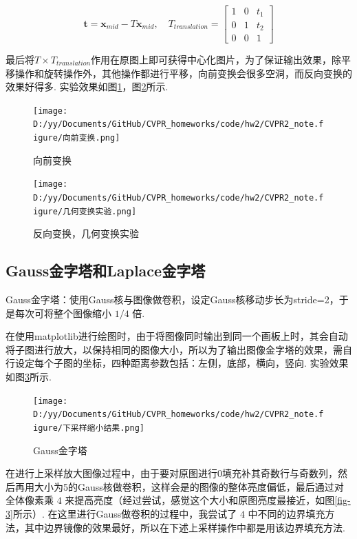 \documentclass[12pt, a4paper, oneside]{ctexart}
\numberwithin{equation}{section}  %
\begin{document}
\[\boldsymbol{t} = \boldsymbol{x}_{mid} - T\boldsymbol{x}_{mid},\quad T_{translation}=\left[\begin{matrix}1&0&t_1\\ 0&1&t_2\\0&0&1\end{matrix}\right]\]

最后将$T\times T_{translation}$作用在原图上即可获得中心化图片，为了保证输出效果，除平移操作和旋转操作外，其他操作都进行平移，向前变换会很多空洞，而反向变换的效果好得多. 实验效果如图\ref{fig-0}，图\ref{fig-1}所示.

\begin{figure}[htbp]
    \centering
    \hspace*{-1.5cm}
    \texttt{[image: D:/yy/Documents/GitHub/CVPR\_homeworks/code/hw2/CVPR2\_note.figure/向前变换.png]}
    \caption{向前变换\label{fig-0}}
\end{figure}
\begin{figure}[htbp]
    \centering
    \hspace*{-1.5cm}
    \texttt{[image: D:/yy/Documents/GitHub/CVPR\_homeworks/code/hw2/CVPR2\_note.figure/几何变换实验.png]}
    \caption{反向变换，几何变换实验\label{fig-1}}
\end{figure}

\subsection{Gauss金字塔和Laplace金字塔}

Gauss金字塔：使用Gauss核与图像做卷积，设定Gauss核移动步长为stride=2，于是每次可将整个图像缩小
\(1/4\) 倍.

在使用matplotlib进行绘图时，由于将图像同时输出到同一个画板上时，其会自动将子图进行放大，以保持相同的图像大小，所以为了输出图像金字塔的效果，需自行设定每个子图的坐标，四种距离参数包括：左侧，底部，横向，竖向. 实验效果如图\ref{fig-2}所示.

\begin{figure}[htbp]
    \centering
    \texttt{[image: D:/yy/Documents/GitHub/CVPR\_homeworks/code/hw2/CVPR2\_note.figure/下采样缩小结果.png]}
    \caption{Gauss金字塔\label{fig-2}}
\end{figure}

在进行上采样放大图像过程中，由于要对原图进行0填充补其奇数行与奇数列，然后再用大小为5的Gauss核做卷积，这样会是的图像的整体亮度偏低，最后通过对全体像素乘
\(4\) 来提高亮度（经过尝试，感觉这个大小和原图亮度最接近，如图\ref{fig-3}所示）.
在这里进行Gauss做卷积的过程中，我尝试了 \(4\)
中不同的边界填充方法，其中边界镜像的效果最好，所以在下述上采样操作中都是用该边界填充方法.
\end{document}
